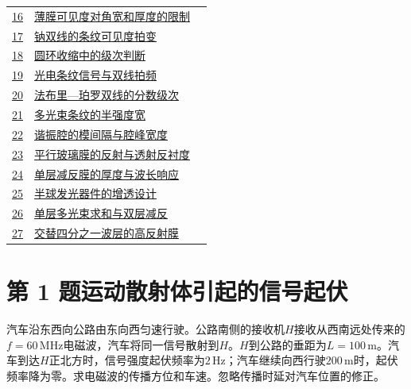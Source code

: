 \documentclass[UTF8,fontset=fandol,a4paper,11pt]{ctexart}
\begin{document}
\begin{longtable}{@{}r p{113mm} r@{}}
\hyperref[q:16]{16} & \hyperref[q:16]{薄膜可见度对角宽和厚度的限制} & \pageref{q:16} \\

\hyperref[q:17]{17} & \hyperref[q:17]{钠双线的条纹可见度拍变} & \pageref{q:17} \\

\hyperref[q:18]{18} & \hyperref[q:18]{圆环收缩中的级次判断} & \pageref{q:18} \\

\hyperref[q:19]{19} & \hyperref[q:19]{光电条纹信号与双线拍频} & \pageref{q:19} \\

\hyperref[q:20]{20} & \hyperref[q:20]{法布里—珀罗双线的分数级次} & \pageref{q:20} \\

\hyperref[q:21]{21} & \hyperref[q:21]{多光束条纹的半强度宽} & \pageref{q:21} \\

\hyperref[q:22]{22} & \hyperref[q:22]{谐振腔的模间隔与腔峰宽度} & \pageref{q:22} \\

\hyperref[q:23]{23} & \hyperref[q:23]{平行玻璃膜的反射与透射反衬度} & \pageref{q:23} \\

\hyperref[q:24]{24} & \hyperref[q:24]{单层减反膜的厚度与波长响应} & \pageref{q:24} \\

\hyperref[q:25]{25} & \hyperref[q:25]{半球发光器件的增透设计} & \pageref{q:25} \\

\hyperref[q:26]{26} & \hyperref[q:26]{单层多光束求和与双层减反} & \pageref{q:26} \\

\hyperref[q:27]{27} & \hyperref[q:27]{交替四分之一波层的高反射膜} & \pageref{q:27} \\

\bottomrule\end{longtable}

\clearpage


\section*{第 1 题\quad 运动散射体引起的信号起伏}\label{q:1}

汽车沿东西向公路由东向西匀速行驶。公路南侧的接收机$H$接收从西南远处传来的$f=60\,\mathrm{MHz}$电磁波，汽车将同一信号散射到$H$。$H$到公路的垂距为$L=100\,\mathrm m$。汽车到达$H$正北方时，信号强度起伏频率为$2\,\mathrm{Hz}$；汽车继续向西行驶$200\,\mathrm m$时，起伏频率降为零。求电磁波的传播方位和车速。忽略传播时延对汽车位置的修正。
\end{document}
